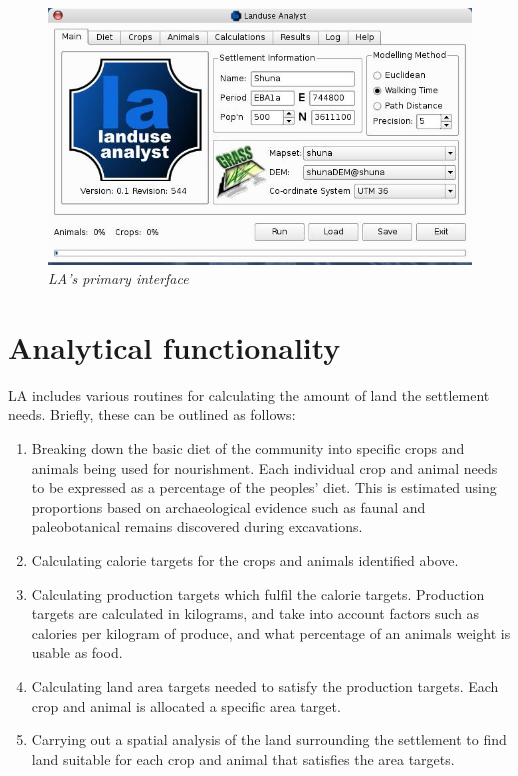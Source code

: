 \begin{figure}[htbp] %
  \includegraphics[scale=0.36]{./images/LanduseAnalyst544.jpg}
  \caption{\label{fig:la544}\textit{LA's primary interface}}
\end{figure}

\section{Analytical functionality} \label{sec:Analytical Functionality}
  LA includes various routines for calculating the amount of land 
  the settlement needs.  Briefly, these can be outlined as follows:
  \begin{enumerate} 
    \item Breaking down the basic diet of the community into specific crops and
      animals being used for nourishment.  Each individual crop and animal needs to
      be expressed as a percentage of the peoples' diet.  This is estimated using
      proportions based on archaeological evidence such as faunal and
      paleobotanical remains discovered during excavations.  
    \item Calculating calorie targets for the crops and animals identified above.
    \item Calculating production targets which fulfil the calorie targets.
      Production targets are calculated in kilograms, and take into account factors
      such as calories per kilogram of produce, and what percentage of an animals
      weight is usable as food.  
    \item Calculating land area targets needed to satisfy the production targets.
      Each crop and animal is allocated a specific area target.  
    \item Carrying out a spatial analysis of the land surrounding the settlement
      to find land suitable for each crop and animal that satisfies the area
      targets.
  \end{enumerate}

